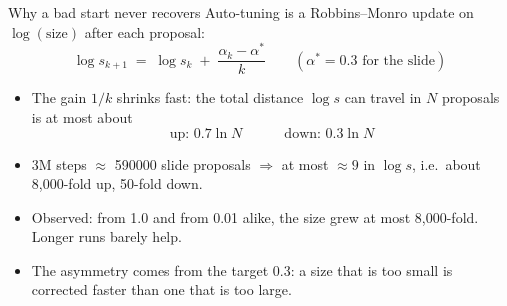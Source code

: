 \documentclass[aspectratio=169,11pt]{beamer}
\begin{document}
\begin{frame}{Why a bad start never recovers}
  Auto-tuning is a Robbins--Monro update on $\log(\text{size})$ after each proposal:
  \[
    \log s_{k+1} \;=\; \log s_k \;+\; \frac{\alpha_k - \alpha^\ast}{k}
    \qquad (\alpha^\ast = 0.3 \text{ for the slide})
  \]
  \begin{itemize}
    \item The gain $1/k$ shrinks fast: the total distance $\log s$ can travel in $N$ proposals is at
      most about
      \[
        \text{up: } 0.7 \ln N \qquad\quad \text{down: } 0.3 \ln N
      \]
    \item 3M steps $\approx$ \num{590000} slide proposals $\Rightarrow$ at most $\approx 9$ in
      $\log s$, i.e.\ about \alert{8,000-fold up}, 50-fold down.
    \item Observed: from 1.0 and from 0.01 alike, the size grew at most 8,000-fold. Longer runs barely help.
    \item The asymmetry comes from the target 0.3: a size that is too small is corrected faster
      than one that is too large.
  \end{itemize}
\end{frame}
\end{document}
